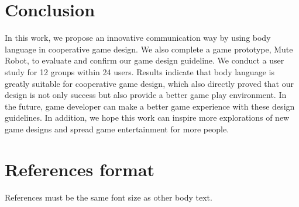 \documentclass{sigchi}
\begin{document}

\section{Conclusion}

In this work, we propose an innovative communication way by using body language in cooperative game design. We also complete a game prototype, Mute Robot, to evaluate and confirm our game design guideline. We conduct a user study for 12 groups within 24 users. Results indicate that body language is greatly suitable for cooperative game design, which also directly proved that our design is not only success but also provide a better game play environment. In the future, game developer can make a better game experience with these design guidelines. In addition, we hope this work can inspire more explorations of new game designs and spread game entertainment for more people.


\balance

\section{References format}
References must be the same font size as other body text.



\end{document}
